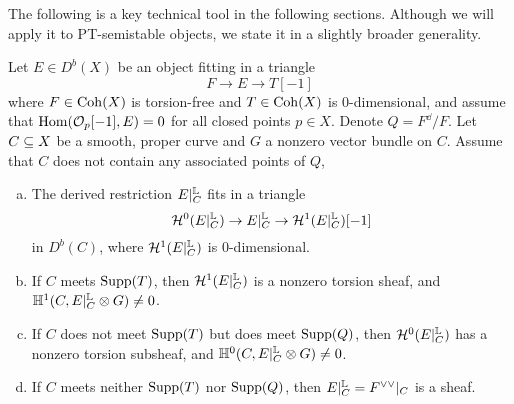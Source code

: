 The following is a key technical tool in the following sections. Although we will apply it to PT-semistable objects, we state it in a slightly broader generality.
\begin{prop}\label{restprop} %
Let $E \in D^b(X)$ be an object fitting in a triangle
\[ F \to E \to T[-1] \]
where $F \in \operatorname{\mathrm{Coh}}(X)$ is torsion-free and $T \in \operatorname{\mathrm{Coh}}(X)$ is 0-dimensional, and assume that $\mathrm{Hom}(\mathcal{O}_p[-1], E) = 0$ for all closed points $p \in X$. Denote $Q = F^\dd/F$. Let $C \subseteq X$ be a smooth, proper curve and $G$ a nonzero vector bundle on $C$. Assume that $C$ does not contain any associated points of $Q$, 
\begin{enumerate}[(a)]
    \item The derived restriction $E|^{\mathbb{L}}_C$ fits in a triangle
    \[ \mathcal{H}^0(E|^{\mathbb{L}}_C) \to E|^{\mathbb{L}}_C \to \mathcal{H}^1(E|^{\mathbb{L}}_C)[-1] \]
    in $D^b(C)$, where $\mathcal{H}^1(E|^{\mathbb{L}}_C)$ is 0-dimensional.
    \item If $C$ meets $\operatorname{\mathrm{Supp}}(T)$, then $\mathcal{H}^1(E|^{\mathbb{L}}_C)$ is a nonzero torsion sheaf, and $\mathbb{H}^1(C, E|^{\mathbb{L}}_C \otimes G) \neq 0$.
    \item If $C$ does not meet $\operatorname{\mathrm{Supp}}(T)$ but does meet $\operatorname{\mathrm{Supp}}(Q)$, then $\mathcal{H}^0(E|^{\mathbb{L}}_C)$ has a nonzero torsion subsheaf, and $\mathbb{H}^0(C, E|^{\mathbb{L}}_C \otimes G) \neq 0$.
    \item If $C$ meets neither $\operatorname{\mathrm{Supp}}(T)$ nor $\operatorname{\mathrm{Supp}}(Q)$, then $E|^{\mathbb{L}}_C = F^{\vee\vee}|_C$ is a sheaf.
\end{enumerate}
\end{prop}
